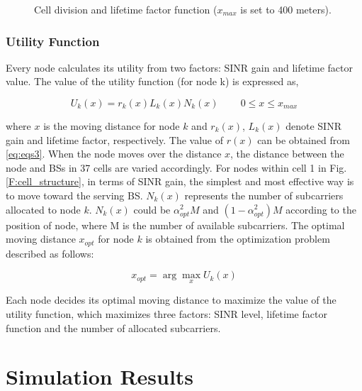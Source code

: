 \documentclass[conference]{IEEEtran}
\begin{document}
\begin{figure}[t]
\centering
{}
\label{F:lifetime}
\caption{Cell division and lifetime factor function ($x_{max} $ is set to 400 meters).}
\end{figure}




\subsubsection{Utility Function}


Every node calculates its utility from two factors: SINR gain and lifetime factor value. The value of the utility function (for node k) is expressed as,

\begin{equation}
U_{k}(x) = r_{k}(x)L_{k}(x)N_{k}(x)\quad \quad \  0 \leq x \leq x_{max}
\label{eq:eqs7}
\end{equation}


\noindent where $x$ is the moving distance for node $k$ and $ r_{k} (x) $, $ L_{k} (x) $ denote SINR gain and lifetime factor, respectively. The value of $ r(x) $ can be obtained from \eqref{eq:eqs3}. When the node moves over the distance $x$, the distance between the node and BSs in 37 cells are varied accordingly. For nodes within cell 1 in Fig. \ref{F:cell_structure}, in terms of SINR gain, the simplest and most effective way is to move toward the serving BS. $ N_{k}(x) $ represents the number of subcarriers allocated to node $ k $. $ N_{k}(x) $ could be $ \alpha_{opt}^2 M $ and $ (1- \alpha_{opt}^2 ) M $ according to the position of node, where M is the number of available subcarriers. The optimal moving distance $x_{opt}$ for node $k$ is obtained from the optimization problem described as follows:

 \begin{equation}
x_{opt} = \arg \max_{x} U_{k}(x)
\label{eq:eqs9}
\end{equation}

Each node decides its optimal moving distance to maximize the value of the utility function, which maximizes three factors: SINR level, lifetime factor function and the number of allocated subcarriers.


\section{Simulation Results}
\end{document}
